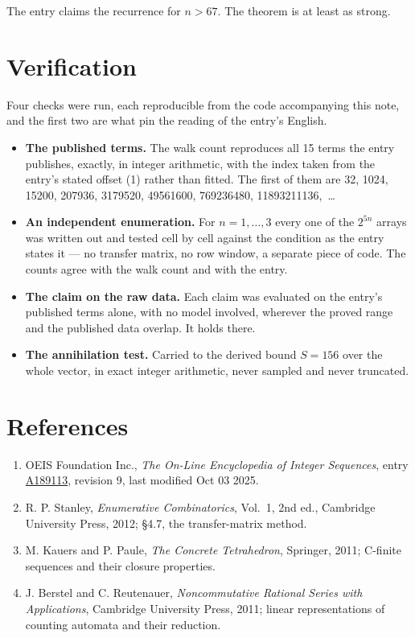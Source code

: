 \documentclass[11pt]{article}
\theoremstyle{definition}
\begin{document}
The entry claims the recurrence for $n > 67$. The theorem is at least as strong.

\section{Verification}

Four checks were run, each reproducible from the code accompanying this note, and the first two are what pin the reading of the entry's English.

\begin{itemize}

\item {\bfseries The published terms.} The walk count reproduces all 15 terms the entry publishes, exactly, in integer arithmetic, with the index taken from the entry's stated offset (1) rather than fitted. The first of them are 32, 1024, 15200, 207936, 3179520, 49561600, 769236480, 11893211136,~\dots

\item {\bfseries An independent enumeration.} For $n = 1,\dots,3$ every one of the $2^{5n}$ arrays was written out and tested cell by cell against the condition as the entry states it --- no transfer matrix, no row window, a separate piece of code. The counts agree with the walk count and with the entry.

\item {\bfseries The claim on the raw data.} Each claim was evaluated on the entry's published terms alone, with no model involved, wherever the proved range and the published data overlap. It holds there.

\item {\bfseries The annihilation test.} Carried to the derived bound $S = 156$ over the whole vector, in exact integer arithmetic, never sampled and never truncated.

\end{itemize}

\section{References}

\begin{enumerate}

\item OEIS Foundation Inc., \emph{The On-Line Encyclopedia of Integer Sequences}, entry \href{https://oeis.org/A189113}{A189113}, revision 9, last modified Oct 03 2025.

\item R. P. Stanley, \emph{Enumerative Combinatorics}, Vol.~1, 2nd ed., Cambridge University Press, 2012; \S4.7, the transfer-matrix method.

\item M. Kauers and P. Paule, \emph{The Concrete Tetrahedron}, Springer, 2011; C-finite sequences and their closure properties.

\item J. Berstel and C. Reutenauer, \emph{Noncommutative Rational Series with Applications}, Cambridge University Press, 2011; linear representations of counting automata and their reduction.

\end{enumerate}
\end{document}
